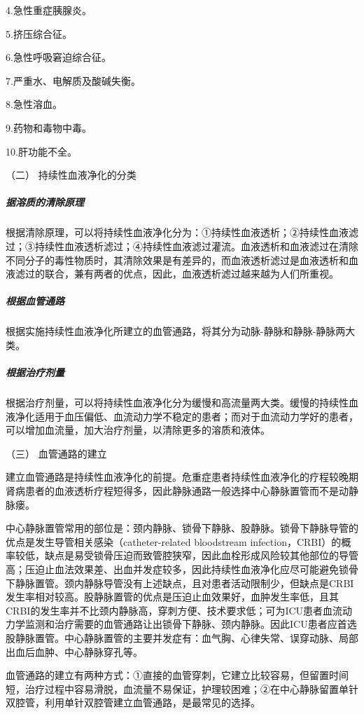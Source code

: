 4.急性重症胰腺炎。

5.挤压综合征。

6.急性呼吸窘迫综合征。

7.严重水、电解质及酸碱失衡。

8.急性溶血。

9.药物和毒物中毒。

10.肝功能不全。

\hypertarget{text00391.htmlux5cux23CHP16-10-2-3-2}{}
（二） 持续性血液净化的分类

\subparagraph{据溶质的清除原理}

根据清除原理，可以将持续性血液净化分为：①持续性血液透析；②持续性血液滤过；③持续性血液透析滤过；④持续性血液滤过灌流。血液透析和血液滤过在清除不同分子的毒性物质时，其清除效果是有差异的，而血液透析滤过是血液透析和血液滤过的联合，兼有两者的优点，因此，血液透析滤过越来越为人们所重视。

\subparagraph{根据血管通路}

根据实施持续性血液净化所建立的血管通路，将其分为动脉-静脉和静脉-静脉两大类。

\subparagraph{根据治疗剂量}

根据治疗剂量，可以将持续性血液净化分为缓慢和高流量两大类。缓慢的持续性血液净化适用于血压偏低、血流动力学不稳定的患者；而对于血流动力学好的患者，可以增加血流量，加大治疗剂量，以清除更多的溶质和液体。

\hypertarget{text00391.htmlux5cux23CHP16-10-2-3-3}{}
（三） 血管通路的建立

建立血管通路是持续性血液净化的前提。危重症患者持续性血液净化的疗程较晚期肾病患者的血液透析疗程短得多，因此静脉通路一般选择中心静脉置管而不是动静脉瘘。

中心静脉置管常用的部位是：颈内静脉、锁骨下静脉、股静脉。锁骨下静脉导管的优点是发生导管相关感染（catheter-related
bloodstream
infection，CRBI）的概率较低，缺点是易受锁骨压迫而致管腔狭窄，因此血栓形成风险较其他部位的导管高；压迫止血法效果差、出血并发症较多，因此持续性血液净化应尽可能避免锁骨下静脉置管。颈内静脉导管没有上述缺点，且对患者活动限制少，但缺点是CRBI发生率相对较高。股静脉置管的优点是压迫止血效果好，血肿发生率低，且其CRBI的发生率并不比颈内静脉高，穿刺方便、技术要求低；可为ICU患者血流动力学监测和治疗需要的血管通路让出锁骨下静脉、颈内静脉。因此ICU患者应首选股静脉置管。中心静脉置管的主要并发症有：血气胸、心律失常、误穿动脉、局部出血后血肿、中心静脉穿孔等。

血管通路的建立有两种方式：①直接的血管穿刺，它建立比较容易，但留置时间短，治疗过程中容易滑脱，血流量不易保证，护理较困难；②在中心静脉留置单针双腔管，利用单针双腔管建立血管通路，是最常见的选择。

